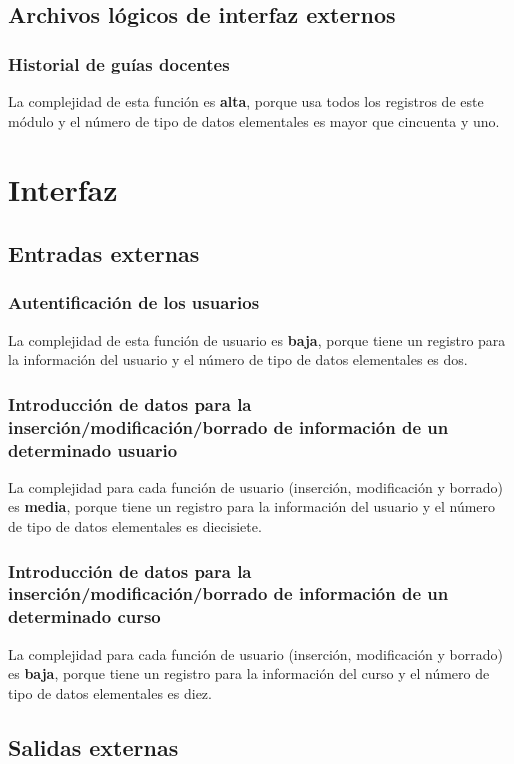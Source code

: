 \documentclass[11pt,a4paper,spanish,twoside]{book}
\begin{document}
\subsection{Archivos lógicos de interfaz externos}
\subsubsection{Historial de guías docentes}
La complejidad de esta función es \textbf{alta}, porque usa todos los
registros de este módulo y el número de tipo de datos elementales es mayor
que cincuenta y uno. 


\section{Interfaz}
\subsection{Entradas externas}
\subsubsection{Autentificación de los usuarios}
La complejidad de esta función de usuario es \textbf{baja}, porque tiene un
registro para la información del usuario y el número de tipo de datos
elementales es dos. 

\subsubsection{Introducción de datos para la inserción/modificación/borrado 
de información de un determinado usuario}
La complejidad para cada función de usuario (inserción, modificación y
borrado) es \textbf{media}, porque tiene un registro para la información del
usuario y el número de tipo de datos elementales es diecisiete.

\subsubsection{Introducción de datos para la inserción/modificación/borrado 
de información de un determinado curso }
La complejidad para cada función de usuario (inserción, modificación y
borrado) es \textbf{baja}, porque tiene un registro para la información del
curso y el número de tipo de datos elementales es diez.

\subsection{Salidas externas}
\end{document}
